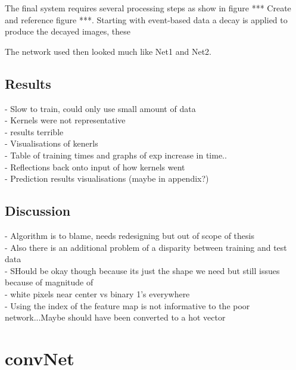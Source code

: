 The final system requires several processing steps as show in figure *** Create and reference figure ***. 
Starting with event-based data a decay is applied to produce the decayed images, these 


The network used then looked much like Net1 and Net2.

\subsection{Results}
 - Slow to train, could only use small amount of data \\
 - Kernels were not representative  \\
 - results terrible \\
 - Visualisations of kenerls \\
 - Table of training times and graphs of exp increase in time.. \\
 - Reflections back onto input of how kernels went \\
 - Prediction results visualisations (maybe in appendix?) \\

\subsection{Discussion}
 - Algorithm is to blame, needs redesigning but out of scope of thesis
\\ - Also there is an additional problem of a disparity between training and test data
\\ - SHould be okay though because its just the shape we need but still issues because of magnitude of
\\ - white pixels near center vs binary 1's everywhere
\\ - Using the index of the feature map is not informative to the poor network...Maybe should have been converted to a hot vector


\section{convNet}

